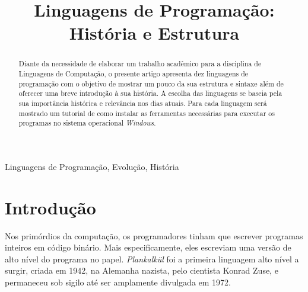 \documentclass[conference]{IEEEtran}
\begin{document}
\title{Linguagens de Programação: História e Estrutura\\
}

\author{
}

\maketitle

\begin{abstract}
Diante da necessidade de elaborar um trabalho acadêmico para a disciplina de Linguagens de Computação, o presente artigo apresenta dez linguagens de programação com o objetivo de mostrar um pouco da sua estrutura e sintaxe além de oferecer uma breve introdução à sua história. A escolha das linguagens se baseia pela sua importância histórica e relevância nos dias atuais. Para cada linguagem será mostrado um tutorial de como instalar as ferramentas necessárias para executar os programas no sistema operacional \textit{Windows}.
\begin{comment}
Diante da necessidade de elaborar um trabalho acadêmico para a disciplina de Linguagens de Computação, o presente artigo apresenta dez linguagens de programação com o objetivo de mostrar um pouco da sua estrutura e sintaxe além de oferecer uma breve introdução à sua história. A escolha das linguagens se baseia pela sua importância histórica e relevância nos dias atuais. Para cada linguagem será mostrado um tutorial de como instalar as ferramentas necessárias para executar os programas no sistema operacional Windows.
\end{comment}
\end{abstract}

\begin{IEEEkeywords}
Linguagens de Programação, Evolução, História
\end{IEEEkeywords}

\section{Introdução}
Nos primórdios da computação, os programadores tinham que escrever programas inteiros em código binário. Mais especificamente, eles escreviam uma versão de alto nível do programa no papel. \textit{Plankalkül} foi a primeira linguagem alto nível a surgir, criada em 1942, na Alemanha nazista, pelo cientista Konrad Zuse, e permaneceu sob sigilo até ser amplamente divulgada em 1972. 
\end{document}
